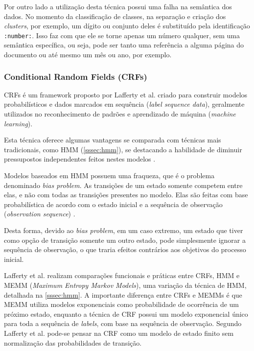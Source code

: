 Por outro lado a utilização desta técnica possui uma falha na semântica dos dados. No momento da classificação de classes, na separação e criação dos \textit{clusters}, por exemplo, um dígito ou conjunto deles é substituído pela identificação \texttt{:number:}. Isso faz com que ele se torne apenas um número qualquer, sem uma semântica específica, ou seja, pode ser tanto uma referência a alguma página do documento ou até mesmo um mês ou ano, por exemplo.


\subsubsection{Conditional Random Fields (CRFs)}
\label{sssec:crf}


CRFs é um framework proposto por Lafferty et al. \cite{Lafferty-CRF} criado para construir modelos probabilísticos e dados marcados em sequência (\textit{label sequence data}), geralmente utilizados no reconhecimento de padrões e aprendizado de máquina (\textit{machine learning}).

Esta técnica oferece algumas vantagens se comparada com técnicas mais tradicionais, como HMM (\autoref{sssec:hmm}), se destacando a habilidade de diminuir pressupostos independentes feitos nestes modelos \cite{Lafferty-CRF}.

Modelos baseados em HMM possuem uma fraqueza, que é o problema denominado \textit{bias problem}. As transições de um estado somente competem entre elas, e não com todas as transições presentes no modelo. Elas são feitas com base probabilística de acordo com o estado inicial e a sequência de observação (\textit{observation sequence}) \cite{Lafferty-CRF}.

Desta forma, devido ao \textit{bias problem}, em um caso extremo, um estado que tiver como opção de transição somente um outro estado, pode simplesmente ignorar a sequência de observação, o que traria efeitos contrários aos objetivos do processo inicial.

Lafferty et al. realizam comparações funcionais e práticas entre CRFs, HMM e MEMM (\textit{Maximum Entropy Markov Models}), uma variação da técnica de HMM, detalhada na \autoref{sssec:hmm}. A importante diferença entre CRFs e MEMMs é que MEMM utiliza modelos exponenciais como probabilidade de ocorrência de um próximo estado, enquanto a técnica de CRF possui um modelo exponencial único para toda a sequência de \textit{labels}, com base na sequência de observação. Segundo Lafferty et al. \cite{Lafferty-CRF} pode-se pensar na CRF como um modelo de estado finito sem normalização das probabilidades de transição.

